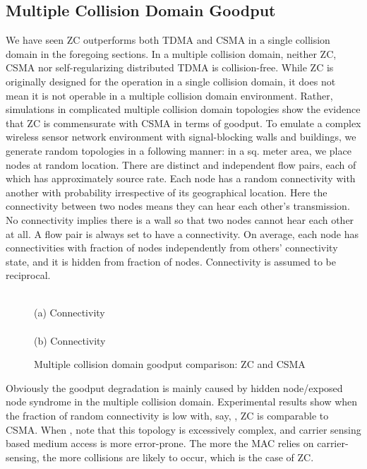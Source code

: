 \documentclass{acm_proc_article-sp}
\begin{document}
\subsection{Multiple Collision Domain Goodput}
\label{s.mc}
We have seen ZC outperforms both TDMA and CSMA in a single collision domain in the foregoing sections. In a multiple collision domain, neither ZC, CSMA nor self-regularizing distributed TDMA is collision-free. While ZC is originally designed for the operation in a single collision domain, it does not mean it is not operable in a multiple collision domain environment. Rather, simulations in complicated multiple collision domain topologies show the evidence that ZC is commensurate with CSMA in terms of goodput.
To emulate a complex wireless sensor network environment with signal-blocking walls and buildings, we generate random topologies in a following manner: in a  sq. meter area, we place  nodes at random location. There are  distinct and independent flow pairs, each of which has approximately  source rate. Each node has a random connectivity with another with probability  irrespective of its geographical location. Here the connectivity between two nodes means they can hear each other's transmission. No connectivity implies there is a wall so that two nodes cannot hear each other at all. A flow pair is always set to have a connectivity. On average, each node has connectivities with  fraction of  nodes independently from others' connectivity state, and it is hidden from  fraction of  nodes. Connectivity is assumed to be reciprocal.

\begin{figure}[ht]
    \begin{center}\small
     \\ (a) Connectivity  \\
    \\ (b) Connectivity 
    \normalsize
    \caption{Multiple collision domain goodput comparison: ZC and CSMA}\label{fig.mc}
    \end{center}
\vspace{-0.2in}
\end{figure}

Obviously the goodput degradation is mainly caused by hidden node/exposed node syndrome in the multiple collision domain. Experimental results show when the fraction of random connectivity is low with, say, , ZC is comparable to CSMA. When , note that this topology is excessively complex, and carrier sensing based medium access is more error-prone. The more the MAC relies on carrier-sensing, the more collisions are likely to occur, which is the case of ZC.
\end{document}
